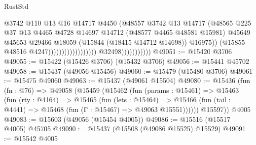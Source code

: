\begin{lexlean}{RustStd}
\begin{coremodule}
                                                            @3742
                                                            @110
                                                            @13
                                                            @16
                                                            @14717
                                                            @4450
                                                            (@48557
                                                              @3742
                                                              @13
                                                              @14717
                                                              (@48565
                                                                @225
                                                                @37
                                                                @13
                                                                @4465
                                                                @4728
                                                                @14697
                                                                @14712
                                                                (@48577 @4465 @48581 @15981)
                                                                @45649
                                                                @45653
                                                                @29466
                                                                @18059
                                                                (@15844 (@18415 @14712 @14698))
                                                                @16975))
                                                            (@15855 @48516 @4247))))))))))))))))))
                          @32498)))))))))))
@49051 := @15420 @3706
@49055 := @15422 (@15426 @3706) (@15432 @3706)
@49056 := @15441 @45702
@49058 := @15437 (@49056 @15456)
@49060 := @15479 (@15480 @3706)
@49061 := @15475 @49060
@49063 := @15437 (@49061 @15504)
@49080 := @15436
    (fun (fn : @76) =>
    @49058
      (@15459
        (@15462
          (fun (params : @15461) =>
          @15463
            (fun (rty : @4164) =>
            @15465
              (fun (lets : @15464) =>
              @15466 (fun (tail : @4441) => @15468 (fun (Γ : @15467) => @49063 @15551))))))
        @15597))
    @4005
@49083 := @15603 (@49056 (@15454 @4005))
@49086 := @15516 (@15517 @4005) @45705
@49090 := @15437 (@15508 (@49086 @15525) @15529)
@49091 := @15542 @4005

\end{coremodule}
\end{lexlean}
